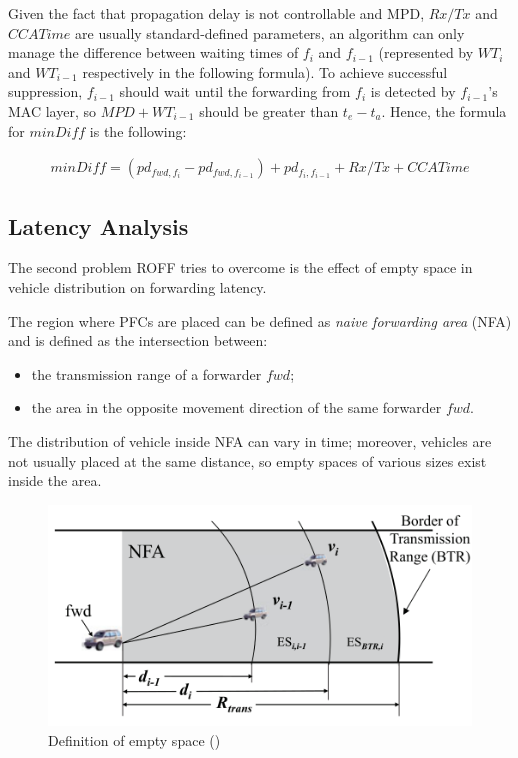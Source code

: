 			
			Given the fact that propagation delay is not controllable and MPD, $Rx/Tx$ and $CCATime$ are usually standard-defined parameters, an algorithm can only manage the difference between waiting times of $f_i$ and $f_{i-1}$ (represented by $WT_i$ and $WT_{i-1}$ respectively in the following formula).
			To achieve successful suppression, $f_{i-1}$ should wait until the forwarding from $f_i$ is detected by $f_{i-1}$'s MAC layer, so $MPD+WT_{i-1}$ should be greater than $t_e - t_a$. Hence, the formula for $minDiff$ is the following:
			
			\begin{gather}
				\label{eq:minDiff}
				minDiff = (pd_{fwd, f_i} - pd_{fwd, f_{i-1}}) + pd_{f_i, f_{i-1}} + Rx/Tx + CCATime 
			\end{gather}
		
		\subsection{Latency Analysis}
			\label{ssec:latency-analysis}
			The second problem ROFF tries to overcome is the effect of empty space in vehicle distribution on forwarding latency.
			
			The region where PFCs are placed can be defined as \textit{naive forwarding area} (NFA) and is defined as the intersection between:
			\begin{itemize}
				\item the transmission range of a forwarder $fwd$;
				\item the area in the opposite movement direction of the same forwarder $fwd$.
			\end{itemize}
			The distribution of vehicle inside NFA can vary in time; moreover, vehicles are not usually placed at the same distance, so empty spaces of various sizes exist inside the area.
			
			\begin{figure}[H]
				\centering
				\includegraphics[width=\textwidth]{immagini/emptySpace}
				\caption{Definition of empty space (\cite{6906275})}
				\label{fig:emptySpace}
			\end{figure}
			
